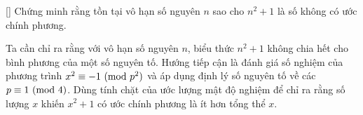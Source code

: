 \documentclass[../08-quadratic-residues.tex]{subfiles}
\begin{document}
\begin{example*}\label{example:CHN-2015-TST2-D2-P3}[\textbf{}]
	Chứng minh rằng tồn tại vô hạn số nguyên \( n \) sao cho \( n^2 + 1 \) là số không có ước chính phương.
\end{example*}

\begin{story*}
	Ta cần chỉ ra rằng với vô hạn số nguyên \( n \), biểu thức \( n^2 + 1 \) không chia hết cho bình phương của một số nguyên tố.
	Hướng tiếp cận là đánh giá số nghiệm của phương trình \( x^2 \equiv -1 \ (\mathrm{mod}\ p^2) \) và áp dụng định lý số nguyên tố về các \( p \equiv 1 \ (\mathrm{mod}\ 4) \).
	Dùng tính chặt của ước lượng mật độ nghiệm để chỉ ra rằng số lượng \( x \) khiến \( x^2 + 1 \) có ước chính phương là ít hơn tổng thể \( x \).
\end{story*}
\end{document}
